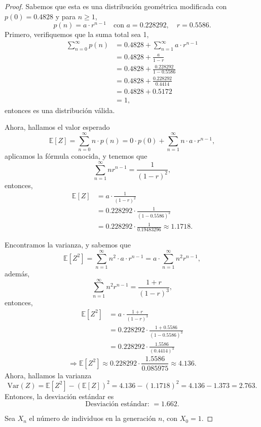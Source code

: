 \documentclass{article}
\begin{document}
\begin{proof}
\item[(a)] Sabemos que esta es una distribución geométrica modificada con \( p(0) = 0.4828 \) y para \( n \geq 1 \),
\[
p(n) = a \cdot r^{n-1} \quad \text{con } a = 0.228292, \quad r = 0.5586.
\]
Primero, verifiquemos que la suma total sea 1, 
\begin{align*}
\sum_{n=0}^\infty p(n) & = 0.4828 + \sum_{n=1}^\infty a \cdot r^{n-1} \\
&= 0.4828 + \frac{a}{1 - r} \\
&= 0.4828 + \frac{0.228292}{1 - 0.5586} \\
&= 0.4828 + \frac{0.228292}{0.4414} \\
&= 0.4828 + 0.5172 \\
&= 1,
\end{align*}
entonces es una distribución válida.

Ahora, hallamos el valor esperado
\[
\mathbb{E}[Z] = \sum_{n=0}^\infty n \cdot p(n) = 0 \cdot p(0) + \sum_{n=1}^\infty n \cdot a \cdot r^{n-1},
\]
aplicamos la fórmula conocida, y tenemos que
\[
\sum_{n=1}^\infty n r^{n-1} = \frac{1}{(1 - r)^2},
\]
entonces,
\begin{align*}
\mathbb{E}[Z] &= a \cdot \frac{1}{(1 - r)^2} \\
&= 0.228292 \cdot \frac{1}{(1 - 0.5586)^2} \\
&= 0.228292 \cdot \frac{1}{0.19483296} \approx 1.1718.    
\end{align*}

Encontramos la varianza, y sabemos que
\[
\mathbb{E}[Z^2] = \sum_{n=1}^\infty n^2 \cdot a \cdot r^{n-1} = a \cdot \sum_{n=1}^\infty n^2 r^{n-1},
\]
además,
\[
\sum_{n=1}^\infty n^2 r^{n-1} = \frac{1 + r}{(1 - r)^3},
\]
entonces,
\begin{align*}
\mathbb{E}[Z^2] &= a \cdot \frac{1 + r}{(1 - r)^3} \\
&= 0.228292 \cdot \frac{1 + 0.5586}{(1 - 0.5586)^3} \\
&= 0.228292 \cdot \frac{1.5586}{(0.4414)^3}   
\end{align*}
\[
\Rightarrow \mathbb{E}[Z^2] \approx 0.228292 \cdot \frac{1.5586}{0.085975} \approx 4.136.
\]
Ahora, hallamos la varianza
\[
\mathrm{Var}(Z) = \mathbb{E}[Z^2] - (\mathbb{E}[Z])^2 = 4.136 - (1.1718)^2 = 4.136 - 1.373 = 2.763.
\]
Entonces, la desviación estándar es
\[
\text{Desviación estándar: } = 1.662.
\]

\item[(b)] Sea \( X_n \) el número de individuos en la generación \( n \), con \( X_0 = 1 \).


\end{proof}
\end{document}
